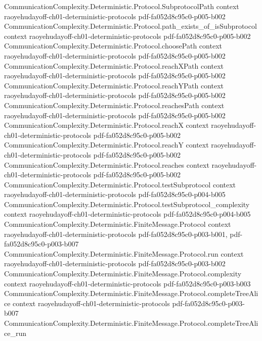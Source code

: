 \begin{theorem}
\proofstep
  {CommunicationComplexity.Deterministic.Protocol.SubprotocolPath}
  {context}
  {raoyehudayoff-ch01-deterministic-protocols}
  {pdf-fa052d8c95c0-p005-b002}
\proofstep
  {CommunicationComplexity.Deterministic.Protocol.path_exists_of_isSubprotocol}
  {context}
  {raoyehudayoff-ch01-deterministic-protocols}
  {pdf-fa052d8c95c0-p005-b002}
\proofstep
  {CommunicationComplexity.Deterministic.Protocol.choosePath}
  {context}
  {raoyehudayoff-ch01-deterministic-protocols}
  {pdf-fa052d8c95c0-p005-b002}
\proofstep
  {CommunicationComplexity.Deterministic.Protocol.reachXPath}
  {context}
  {raoyehudayoff-ch01-deterministic-protocols}
  {pdf-fa052d8c95c0-p005-b002}
\proofstep
  {CommunicationComplexity.Deterministic.Protocol.reachYPath}
  {context}
  {raoyehudayoff-ch01-deterministic-protocols}
  {pdf-fa052d8c95c0-p005-b002}
\proofstep
  {CommunicationComplexity.Deterministic.Protocol.reachesPath}
  {context}
  {raoyehudayoff-ch01-deterministic-protocols}
  {pdf-fa052d8c95c0-p005-b002}
\proofstep
  {CommunicationComplexity.Deterministic.Protocol.reachX}
  {context}
  {raoyehudayoff-ch01-deterministic-protocols}
  {pdf-fa052d8c95c0-p005-b002}
\proofstep
  {CommunicationComplexity.Deterministic.Protocol.reachY}
  {context}
  {raoyehudayoff-ch01-deterministic-protocols}
  {pdf-fa052d8c95c0-p005-b002}
\proofstep
  {CommunicationComplexity.Deterministic.Protocol.reaches}
  {context}
  {raoyehudayoff-ch01-deterministic-protocols}
  {pdf-fa052d8c95c0-p005-b002}
\proofstep
  {CommunicationComplexity.Deterministic.Protocol.testSubprotocol}
  {context}
  {raoyehudayoff-ch01-deterministic-protocols}
  {pdf-fa052d8c95c0-p004-b005}
\proofstep
  {CommunicationComplexity.Deterministic.Protocol.testSubprotocol_complexity}
  {context}
  {raoyehudayoff-ch01-deterministic-protocols}
  {pdf-fa052d8c95c0-p004-b005}
\proofstep
  {CommunicationComplexity.Deterministic.FiniteMessage.Protocol}
  {context}
  {raoyehudayoff-ch01-deterministic-protocols}
  {pdf-fa052d8c95c0-p003-b001,
    pdf-fa052d8c95c0-p003-b007}
\proofstep
  {CommunicationComplexity.Deterministic.FiniteMessage.Protocol.run}
  {context}
  {raoyehudayoff-ch01-deterministic-protocols}
  {pdf-fa052d8c95c0-p003-b002}
\proofstep
  {CommunicationComplexity.Deterministic.FiniteMessage.Protocol.complexity}
  {context}
  {raoyehudayoff-ch01-deterministic-protocols}
  {pdf-fa052d8c95c0-p003-b003}
\proofstep
  {CommunicationComplexity.Deterministic.FiniteMessage.Protocol.completeTreeAlice}
  {context}
  {raoyehudayoff-ch01-deterministic-protocols}
  {pdf-fa052d8c95c0-p003-b007}
\proofstep
  {CommunicationComplexity.Deterministic.FiniteMessage.Protocol.completeTreeAlice_run}

\end{theorem}

